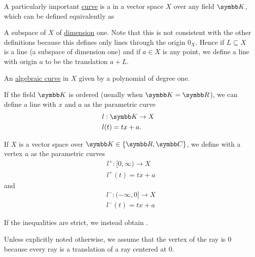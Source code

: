 \begin{definition}\label{def:geometric_line}
  A particularly important \hyperref[def:hypersurface]{curve} is a  in a vector space \( X \) over any field \( \BK \), which can be defined equivalently as

  \begin{DefEnum}
     A subspace of \( X \) of \hyperref[def:vector_space_dimension]{dimension} one. Note that this is not consistent with the other definitions because this defines only lines through the origin \( 0_X \). Hence if \( L \subseteq X \) is a line (a subspace of dimension one) and if \( a \in X \) is any point, we define a line with origin \( a \) to be the translation \( a + L \).

     An \hyperref[def:affine_variety/algebraic_curve]{algebraic curve} in \( X \) given by a polynomial of degree one.

     If the field \( \BK \) is ordered (usually when \( \BK = \BR \)), we can define a line with  \( x \) and  \( a \) as the parametric curve
    \begin{align*}
       & l: \BK \to X   \\
       & l(t) = tx + a.
    \end{align*}
  \end{DefEnum}
\end{definition}

\begin{definition}\label{def:geometric_ray}
  If \( X \) is a vector space over \( \BK \in \{ \BR, \BC \} \), we define  with a vertex \( a \) as the parametric curves
  \begin{align*}
     & l^+: [0, \infty) \to X \\
     & l^+(t) = tx + a
  \end{align*}
  and
  \begin{align*}
     & l^-: (-\infty, 0] \to X \\
     & l^-(t) = tx + a
  \end{align*}

  If the inequalities are strict, we instead obtain .

  Unless explicitly noted otherwise, we assume that the vertex of the ray is \( 0 \) because every ray is a translation of a ray centered at \( 0 \).
\end{definition}

